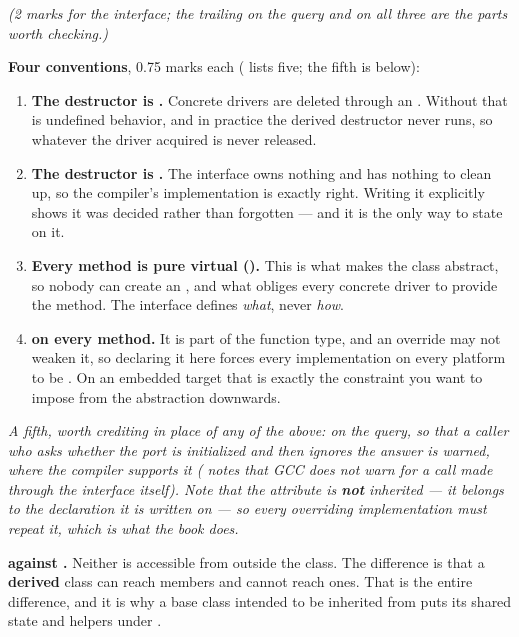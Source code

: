 {\itshape (2 marks for the interface; the trailing  on the query and  on all
three are the parts worth checking.)\par}

\medskip
\textbf{Four conventions}, 0.75 marks each ( lists five; the fifth is below):
\begin{enumerate}
  \item \textbf{The destructor is .} Concrete drivers are deleted through an
    . Without  that is undefined behavior, and in practice the
    derived destructor never runs, so whatever the driver acquired is never released.
  \item \textbf{The destructor is .} The interface owns nothing and has nothing to
    clean up, so the compiler's implementation is exactly right. Writing it explicitly shows it was
    decided rather than forgotten --- and it is the only way to state  on it.
  \item \textbf{Every method is pure virtual ().} This is what makes the class
    abstract, so nobody can create an , and what obliges every concrete driver to
    provide the method. The interface defines \emph{what}, never \emph{how}.
  \item \textbf{ on every method.} It is part of the function type, and an override
    may not weaken it, so declaring it here forces every implementation on every platform to be
    . On an embedded target that is exactly the constraint you want to impose from
    the abstraction downwards.
\end{enumerate}

{\itshape A fifth, worth crediting in place of any of the above: \code{[[nodiscard]]} on the query,
so that a caller who asks whether the port is initialized and then ignores the answer is warned,
where the compiler supports it ( notes that GCC does not warn for a call made
through the interface itself). Note that the attribute is \textbf{not} inherited --- it belongs to
the declaration it is written on --- so every overriding implementation must repeat it, which is
what the book does.\par}

\textbf{ against .} Neither is accessible from outside the class. The
difference is that a \textbf{derived} class can reach  members and cannot reach
 ones. That is the entire difference, and it is why a base class intended to be
inherited from puts its shared state and helpers under . 

